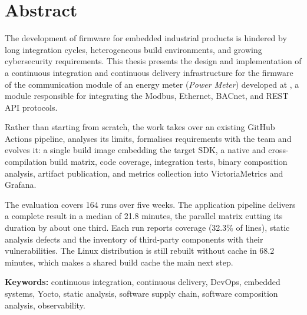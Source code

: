 \vfill

\section*{Abstract}

The development of firmware for embedded industrial products is hindered by
long integration cycles, heterogeneous build environments, and growing
cybersecurity requirements. This
thesis presents the design and implementation of a continuous integration and
continuous delivery
infrastructure for the firmware of the communication module of an energy
meter (\emph{Power Meter}) developed at \Entreprise, a module responsible for
integrating the Modbus, Ethernet, BACnet, and REST API protocols.

Rather than starting from scratch, the work takes over an existing GitHub
Actions pipeline, analyses its limits, formalises requirements with the team
and evolves it: a single build image embedding the target SDK, a native and
cross-compilation build matrix, code coverage, integration tests, binary
composition analysis, artifact publication, and metrics collection into
VictoriaMetrics and Grafana.

The evaluation covers 164 runs over five weeks. The application pipeline
delivers a complete result in a median of 21.8 minutes, the parallel matrix
cutting its duration by about one third. Each run reports coverage (32.3\% of
lines), static analysis defects and the inventory of third-party components
with their vulnerabilities. The Linux distribution is still rebuilt without
cache in 68.2 minutes, which makes a shared build cache the main next step.

\vspace{1cm}
\noindent\textbf{Keywords:} continuous integration, continuous delivery, DevOps,
embedded systems, Yocto, static analysis, software supply chain,
software composition analysis, observability.

\clearpage
